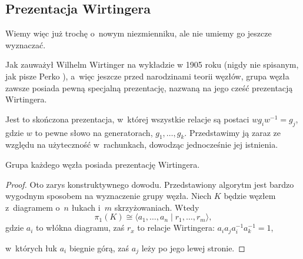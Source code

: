 
\subsection{Prezentacja Wirtingera}
%
Wiemy więc już trochę o~nowym niezmienniku, ale nie umiemy go jeszcze wyznaczać.

Jak zauważył Wilhelm Wirtinger na wykładzie w 1905 roku (nigdy nie spisanym, jak pisze Perko \cite{perko2016}), a~więc jeszcze przed narodzinami teorii węzłów, grupa węzła zawsze posiada pewną specjalną prezentację, nazwaną na jego cześć prezentacją Wirtingera.

%
Jest to skończona prezentacja, w~której wszystkie relacje są postaci $w g_i w^{-1} = g_j$, gdzie $w$ to pewne słowo na generatorach, $g_1, \ldots, g_k$.
Przedstawimy ją zaraz ze względu na użyteczność w~rachunkach, dowodząc jednocześnie jej istnienia.

\begin{proposition}
    Grupa każdego węzła posiada prezentację Wirtingera.
\end{proposition}

\begin{proof}
    Oto zarys konstruktywnego dowodu.
    Przedstawiony algorytm jest bardzo wygodnym sposobem na wyznaczenie grupy węzła.
    Niech $K$ będzie węzłem z~diagramem o~$n$ łukach i~$m$ skrzyżowaniach.
    Wtedy
    \begin{equation}
        \pi_1(K) \cong \langle a_1, \ldots, a_n \mid r_1, \ldots, r_m\rangle,
    \end{equation}
    gdzie $a_i$ to włókna diagramu, zaś $r_x$ to relacje Wirtingera: $a_ia_ja_i^{-1}a_k^{-1}=1$,
\begin{comment}
    \begin{figure}[H]
    \begin{minipage}[b]{.48\linewidth}
        \[
            \LargeWirtingerRelationA
        \]
    \end{minipage}
    \begin{minipage}[b]{.48\linewidth}
        \[
            \LargeWirtingerRelationB
        \]
    \end{minipage}
    \end{figure}
\end{comment}
    w~których łuk $a_i$ biegnie górą, zaś $a_j$ leży po jego lewej stronie.
\end{proof}

